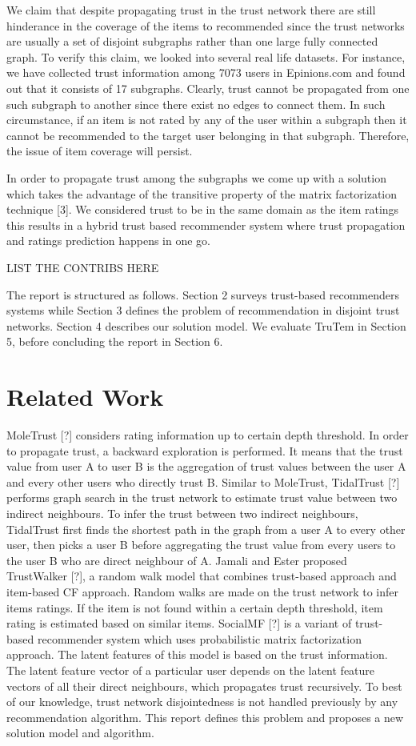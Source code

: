 \documentclass[11pt, conference, onecolumn]{IEEEtran}
\begin{document}
We claim that despite propagating trust in the trust network there are still hinderance in the coverage of the items to recommended since the trust networks are usually a set of disjoint subgraphs rather than one large fully connected graph. To verify this claim, we looked into several real life datasets. For instance, we have collected trust information among 7073 users in Epinions.com and found out that it consists of 17 subgraphs. Clearly, trust cannot be propagated from one such subgraph to another since there exist no edges to connect them. In such circumstance, if an item is not rated by any of the user within a subgraph then it cannot be recommended to the target user belonging in that subgraph. Therefore, the issue of item coverage will persist.

In order to propagate trust among the subgraphs we come up with a solution which takes the advantage of the transitive property of the matrix factorization technique [3]. We considered trust to be in the same domain as the item ratings this results in a hybrid trust based recommender system where trust propagation and ratings prediction happens in one go.

LIST THE CONTRIBS HERE

The report is structured as follows. Section 2 surveys trust-based recommenders systems while Section 3 defines the problem of recommendation in disjoint trust networks. Section 4 describes our solution model. We evaluate TruTem in Section 5, before concluding the report in Section 6.


\section{Related Work} \label{sec:related}
MoleTrust [?] considers rating information up to certain depth threshold. In order to propagate trust, a backward exploration is performed. It means that the trust value from user A to user B is the aggregation of trust values between the user A and every other users who directly trust B. Similar to MoleTrust, TidalTrust [?] performs graph search in the trust network to estimate trust value between two indirect neighbours. To infer the trust between two indirect neighbours, TidalTrust first finds the shortest path in the graph from a user A to every other user, then picks a user B before aggregating the trust value from every users to the user B who are direct neighbour of A. Jamali and Ester proposed TrustWalker [?], a random walk model that combines trust-based approach and item-based CF approach. Random walks are made on the trust network to infer items ratings. If the item is not found within a certain depth threshold, item rating is estimated based on similar items. SocialMF [?] is a variant of trust-based recommender system which uses probabilistic matrix factorization approach. The latent features of this model is based on the trust information. The latent feature vector of a particular user depends on the latent feature vectors of all their direct neighbours, which propagates trust recursively.
To best of our knowledge, trust network disjointedness is not handled previously by any recommendation algorithm. This report defines this problem and proposes a new solution model and algorithm.
\end{document}
